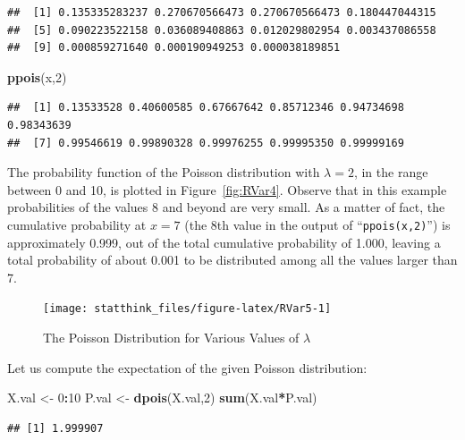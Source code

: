 \documentclass[]{krantz}
\makeatletter
\newenvironment{Shaded}{\begin{snugshade}}{\end{snugshade}}
\newcommand{\KeywordTok}[1]{\textcolor[rgb]{0.13,0.29,0.53}{\textbf{#1}}}
\newcommand{\DecValTok}[1]{\textcolor[rgb]{0.00,0.00,0.81}{#1}}
\newcommand{\StringTok}[1]{\textcolor[rgb]{0.31,0.60,0.02}{#1}}
\newcommand{\OperatorTok}[1]{\textcolor[rgb]{0.81,0.36,0.00}{\textbf{#1}}}
\newcommand{\NormalTok}[1]{#1}
\newenvironment{kframe}{%
\medskip{}
\setlength{\fboxsep}{.8em}
 \def\at@end@of@kframe{}%
 \ifinner\ifhmode%
  \def\at@end@of@kframe{\end{minipage}}%
  \begin{minipage}{\columnwidth}%
 \fi\fi%
 \def\FrameCommand##1{\hskip\@totalleftmargin \hskip-\fboxsep
 \colorbox{shadecolor}{##1}\hskip-\fboxsep
     \hskip-\linewidth \hskip-\@totalleftmargin \hskip\columnwidth}%
 \MakeFramed {\advance\hsize-\width
   \@totalleftmargin\z@ \linewidth\hsize
   \@setminipage}}%
 {\par\unskip\endMakeFramed%
 \at@end@of@kframe}
\renewenvironment{Shaded}{\begin{kframe}}{\end{kframe}}
\theoremstyle{definition}
\theoremstyle{definition}
\theoremstyle{definition}
\theoremstyle{remark}
\makeatother
\begin{document}
\begin{verbatim}
##  [1] 0.135335283237 0.270670566473 0.270670566473 0.180447044315
##  [5] 0.090223522158 0.036089408863 0.012029802954 0.003437086558
##  [9] 0.000859271640 0.000190949253 0.000038189851
\end{verbatim}

\begin{Shaded}
\begin{Highlighting}[]
\KeywordTok{ppois}\NormalTok{(x,}\DecValTok{2}\NormalTok{)}
\end{Highlighting}
\end{Shaded}

\begin{verbatim}
##  [1] 0.13533528 0.40600585 0.67667642 0.85712346 0.94734698 0.98343639
##  [7] 0.99546619 0.99890328 0.99976255 0.99995350 0.99999169
\end{verbatim}

The probability function of the Poisson distribution with
\(\lambda = 2\), in the range between 0 and 10, is plotted in
Figure~\ref{fig:RVar4}. Observe that in this example probabilities of
the values 8 and beyond are very small. As a matter of fact, the
cumulative probability at \(x=7\) (the 8th value in the output of
``\texttt{ppois(x,2)}'') is approximately 0.999, out of the total
cumulative probability of 1.000, leaving a total probability of about
0.001 to be distributed among all the values larger than 7.

\begin{figure}

{\centering \texttt{[image: statthink\_files/figure-latex/RVar5-1]} 

}

\caption{The Poisson Distribution for Various Values of $\lambda$}\label{fig:RVar5}
\end{figure}

Let us compute the expectation of the given Poisson distribution:

\begin{Shaded}
\begin{Highlighting}[]
\NormalTok{X.val <-}\StringTok{ }\DecValTok{0}\OperatorTok{:}\DecValTok{10}
\NormalTok{P.val <-}\StringTok{ }\KeywordTok{dpois}\NormalTok{(X.val,}\DecValTok{2}\NormalTok{)}
\KeywordTok{sum}\NormalTok{(X.val}\OperatorTok{*}\NormalTok{P.val)}
\end{Highlighting}
\end{Shaded}

\begin{verbatim}
## [1] 1.999907
\end{verbatim}
\end{document}
